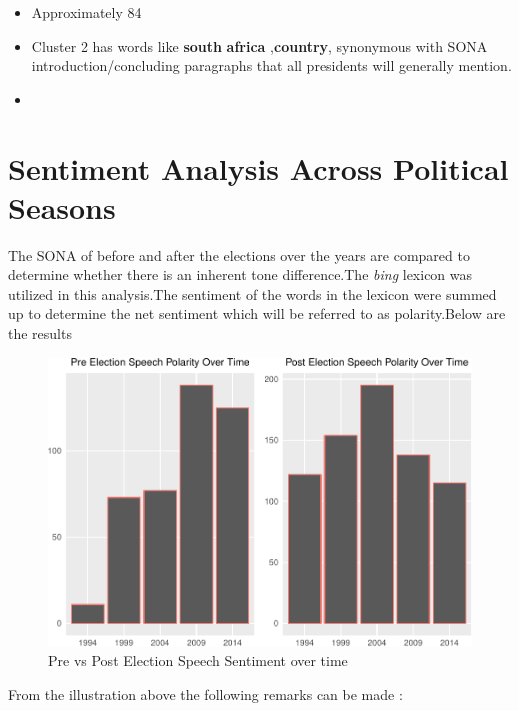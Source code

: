 \documentclass[]{article}
\begin{document}
\begin{itemize}

\item Approximately 84%
\item Cluster 2 has words like \textbf{south} \textbf{africa} ,\textbf{country}, synonymous with SONA introduction/concluding paragraphs that all presidents will generally mention.
\item 
\end{itemize}

\section{Sentiment Analysis Across Political Seasons}

The SONA of before and after the elections over the years are compared
to determine whether there is an inherent tone difference.The
\emph{bing} lexicon was utilized in this analysis.The sentiment of the
words in the lexicon were summed up to determine the net sentiment which
will be referred to as polarity.Below are the results

\begin{figure}[H]

{\centering \includegraphics{datasci_fi_Assignment_2_files/figure-latex/pre_post_sentiment -1} 

}

\caption{Pre vs Post Election Speech Sentiment over time}\label{fig:pre_post_sentiment }
\end{figure}

From the illustration above the following remarks can be made :
\end{document}
